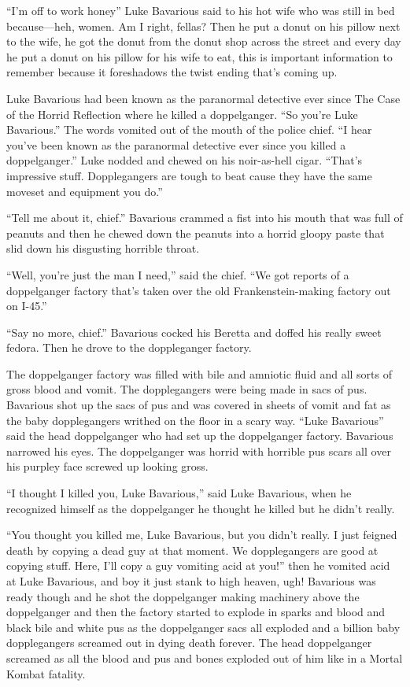 ``I'm off to work honey'' Luke Bavarious said to
his hot wife who was still in bed because---heh, women. Am I
right, fellas? Then he put a donut on his pillow next to the wife,
he got the donut from the donut shop across the street and every
day he put a donut on his pillow for his wife to eat, this is
important information to remember because it foreshadows the twist
ending that's coming up.



Luke Bavarious had been known as the paranormal detective ever
since The Case of the Horrid Reflection where he killed a
doppelganger. ``So you're Luke Bavarious.'' The
words vomited out of the mouth of the police chief. ``I hear
you've been known as the paranormal detective ever since you
killed a doppelganger.'' Luke nodded and chewed on his
noir-as-hell cigar. ``That's impressive stuff.
Dopplegangers are tough to beat cause they have the same moveset
and equipment you do.''

``Tell me about it, chief.'' Bavarious crammed a fist
into his mouth that was full of peanuts and then he chewed down the
peanuts into a horrid gloopy paste that slid down his disgusting
horrible throat.

``Well, you're just the man I need,'' said the
chief. ``We got reports of a doppelganger factory that's
taken over the old Frankenstein-making factory out on
I-45.''

``Say no more, chief.'' Bavarious cocked his Beretta and
doffed his really sweet fedora. Then he drove to the doppleganger
factory.



The doppelganger factory was filled with bile and amniotic fluid
and all sorts of gross blood and vomit. The dopplegangers were
being made in sacs of pus. Bavarious shot up the sacs of pus and
was covered in sheets of vomit and fat as the baby dopplegangers
writhed on the floor in a scary way. ``Luke Bavarious''
said the head doppelganger who had set up the doppelganger factory.
Bavarious narrowed his eyes. The doppelganger was horrid with
horrible pus scars all over his purpley face screwed up looking
gross.

``I thought I killed you, Luke Bavarious,'' said Luke
Bavarious, when he recognized himself as the doppelganger he
thought he killed but he didn't really.

``You thought you killed me, Luke Bavarious, but you
didn't really. I just feigned death by copying a dead guy at
that moment. We dopplegangers are good at copying stuff. Here,
I'll copy a guy vomiting acid at you!'' then he vomited
acid at Luke Bavarious, and boy it just stank to high heaven, ugh!
Bavarious was ready though and he shot the doppelganger making
machinery above the doppelganger and then the factory started to
explode in sparks and blood and black bile and white pus as the
doppelganger sacs all exploded and a billion baby dopplegangers
screamed out in dying death forever. The head doppelganger screamed
as all the blood and pus and bones exploded out of him like in a
Mortal Kombat fatality.

